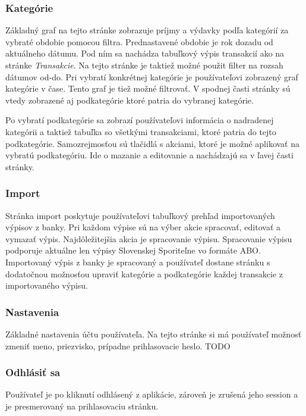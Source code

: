 \documentclass[12pt,oneside]{book}
\begin{document}
\subsubsection{Kategórie}
Základný graf na tejto stránke zobrazuje príjmy a výdavky podľa kategórií za vybraté obdobie pomocou filtra. Prednastavené obdobie je rok dozadu od aktuálneho dátumu. Pod ním sa nachádza tabuľkový výpis transakcií ako na stránke \emph{Transakcie}. Na tejto stránke je taktiež možné použit filter na rozsah dátumov od-do. Pri vybratí konkrétnej kategórie je používateľovi zobrazený graf kategórie v čase. Tento graf je tiež možné filtrovať. V spodnej časti stránky sú vtedy zobrazené aj podkategórie ktoré patria do vybranej kategórie. 

Po vybratí podkategórie sa zobrazí používateľovi informácia o nadradenej kategórii a taktiež tabuľka so všetkými transakciami, ktoré patria do tejto podkategórie. Samozrejmosťou sú tlačidlá s akciami, ktoré je možné aplikovať na vybratú podkategóriu. Ide o mazanie a editovanie a nachádzajú sa v ľavej časti stránky. 



\subsubsection{Import}
Stránka import poskytuje používateľovi tabuľkový prehľad importovaných výpisov z banky. Pri každom výpise sú na výber akcie spracovať, editovať a vymazať výpis. Najdôležitejšia akcia je spracovanie výpisu. Spracovanie výpisu podporuje aktuálne len výpisy Slovenskej Sporiteľne vo formáte ABO. Importovaný výpis z banky je spracovaný a používateľ dostane stránku s dodatočnou možnosťou upraviť kategórie a podkategórie každej transakcie z importovaného výpisu.

\subsubsection{Nastavenia}

Základné nastavenia účtu používateľa. Na tejto stránke si má používateľ možnosť zmeniť meno, priezvisko, prípadne prihlasovacie heslo. TODO

\subsubsection{Odhlásiť sa}

Používateľ je po kliknutí odhlásený z aplikácie, zároveň je zrušená jeho session a je presmerovaný na prihlasovaciu stránku.
\end{document}
